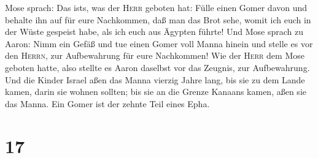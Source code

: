 Mose sprach: Das ist\textquotesingle s, was der \textsc{Herr} geboten
hat: Fülle einen Gomer davon und behalte ihn auf für eure Nachkommen,
daß man das Brot sehe, womit ich euch in der Wüste gespeist habe, als
ich euch aus Ägypten führte!  Und Mose sprach zu Aaron:
Nimm ein Gefäß und tue einen Gomer voll Manna hinein und stelle es vor
den \textsc{Herrn}, zur Aufbewahrung für eure Nachkommen!
 Wie der \textsc{Herr} dem Mose geboten hatte, also
stellte es Aaron daselbst vor das Zeugnis, zur Aufbewahrung.
 Und die Kinder Israel aßen das Manna vierzig Jahre lang,
bis sie zu dem Lande kamen, darin sie wohnen sollten; bis sie an die
Grenze Kanaans kamen, aßen sie das Manna.  Ein Gomer ist
der zehnte Teil eines Epha.

\hypertarget{section-16}{%
\section{17}\label{section-16}}

